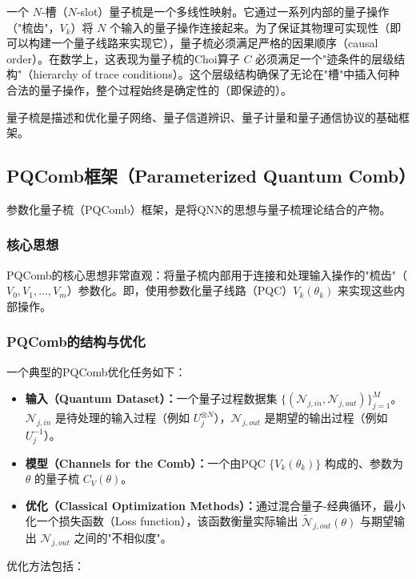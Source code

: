 \documentclass[12pt,a4paper]{article}
\begin{document}
一个 $N$-槽（$N$-slot）量子梳是一个多线性映射。它通过一系列内部的量子操作（"梳齿"，$V_k$）将 $N$ 个输入的量子操作连接起来。为了保证其物理可实现性（即可以构建一个量子线路来实现它），量子梳必须满足严格的因果顺序（causal order）。在数学上，这表现为量子梳的Choi算子 $C$ 必须满足一个"迹条件的层级结构"（hierarchy of trace conditions）。这个层级结构确保了无论在"槽"中插入何种合法的量子操作，整个过程始终是确定性的（即保迹的）。

量子梳是描述和优化量子网络、量子信道辨识、量子计量和量子通信协议的基础框架。

\subsection{PQComb框架（Parameterized Quantum Comb）}

参数化量子梳（PQComb）框架，是将QNN的思想与量子梳理论结合的产物。

\subsubsection{核心思想}

PQComb的核心思想非常直观：将量子梳内部用于连接和处理输入操作的"梳齿"（$V_0, V_1, \ldots, V_m$）参数化。即，使用参数化量子线路（PQC）$V_k(\theta_k)$ 来实现这些内部操作。

\subsubsection{PQComb的结构与优化}

一个典型的PQComb优化任务如下：

\begin{itemize}
\item \textbf{输入（Quantum Dataset）：}一个量子过程数据集 $\{(\mathcal{N}_{j,in}, \mathcal{N}_{j,out})\}_{j=1}^M$。$\mathcal{N}_{j,in}$ 是待处理的输入过程（例如 $U_j^{\otimes N}$），$\mathcal{N}_{j,out}$ 是期望的输出过程（例如 $U_j^{-1}$）。
\item \textbf{模型（Channels for the Comb）：}一个由PQC $\{V_k(\theta_k)\}$ 构成的、参数为 $\theta$ 的量子梳 $C_V(\theta)$。
\item \textbf{优化（Classical Optimization Methods）：}通过混合量子-经典循环，最小化一个损失函数（Loss function），该函数衡量实际输出 $\tilde{\mathcal{N}}_{j,out}(\theta)$ 与期望输出 $\mathcal{N}_{j,out}$ 之间的"不相似度"。
\end{itemize}

优化方法包括：
\end{document}
